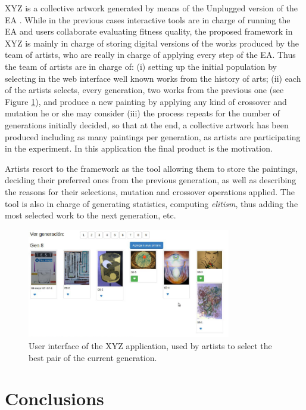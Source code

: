 XYZ is a collective artwork generated by means of the Unplugged version of the EA \cite{de2014artists}.
While in the previous cases interactive tools are in charge of running the EA and users collaborate evaluating
fitness quality, the proposed framework in XYZ is mainly in charge of storing digital versions of the works produced 
by the team of artists, who are really in charge of applying every step of the EA. Thus the team of artists 
are in charge of:  (i) setting up the initial population by selecting in the web interface
well known works from the history of arts;  (ii) each of the artists selects, every generation, two works 
from the previous one (see Figure \ref{fig:xyz}), and produce a new painting by applying 
any kind of crossover and mutation he or she may consider  (iii) the process repeats for the number 
of generations initially decided, so that at the end, a collective  artwork has been produced 
including as many paintings per generation, as artists are participating in the experiment. In this application
the final product is the motivation.  

Artists resort to the framework as the tool allowing them to store the paintings, deciding their preferred ones from the
previous generation, as well as describing the reasons for their selections, mutation and crossover operations applied.
The tool is also in charge of generating statistics, computing \textit{elitism}, thus adding the most selected work to 
the next generation, etc. 

\begin{figure}[!t]
    \centering
        \includegraphics[width=3.5in]{img/interfaceXYZ.png}
    \caption{User interface of the XYZ application, used by artists to select the best pair of the current generation.}
    \label{fig:xyz}
\end{figure}

\section{Conclusions}
\label{sec:conclusions}

